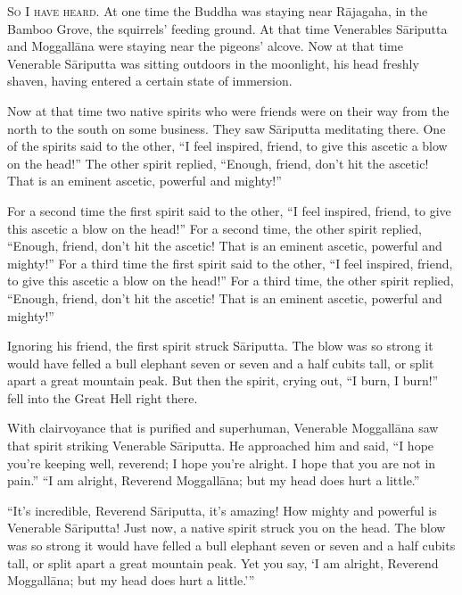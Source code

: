 \documentclass[12pt,openany]{book}%
\newcommand*{\scevam}[1]{\textsc{#1}}
\begin{document}
\scevam{So I have heard. }At one time the Buddha was staying near \textsanskrit{Rājagaha}, in the Bamboo Grove, the squirrels’ feeding ground. At that time Venerables \textsanskrit{Sāriputta} and \textsanskrit{Moggallāna} were staying near the pigeons’ alcove. Now at that time Venerable \textsanskrit{Sāriputta} was sitting outdoors in the moonlight, his head freshly shaven, having entered a certain state of immersion. 

Now at that time two native spirits who were friends were on their way from the north to the south on some business. They saw \textsanskrit{Sāriputta} meditating there. One of the spirits said to the other, “I feel inspired, friend, to give this ascetic a blow on the head!” The other spirit replied, “Enough, friend, don’t hit the ascetic! That is an eminent ascetic, powerful and mighty!” 

For a second time the first spirit said to the other, “I feel inspired, friend, to give this ascetic a blow on the head!” For a second time, the other spirit replied, “Enough, friend, don’t hit the ascetic! That is an eminent ascetic, powerful and mighty!” For a third time the first spirit said to the other, “I feel inspired, friend, to give this ascetic a blow on the head!” For a third time, the other spirit replied, “Enough, friend, don’t hit the ascetic! That is an eminent ascetic, powerful and mighty!” 

Ignoring his friend, the first spirit struck \textsanskrit{Sāriputta}. The blow was so strong it would have felled a bull elephant seven or seven and a half cubits tall, or split apart a great mountain peak. But then the spirit, crying out, “I burn, I burn!” fell into the Great Hell right there. 

With clairvoyance that is purified and superhuman, Venerable \textsanskrit{Moggallāna} saw that spirit striking Venerable \textsanskrit{Sāriputta}. He approached him and said, “I hope you’re keeping well, reverend; I hope you’re alright. I hope that you are not in pain.” “I am alright, Reverend \textsanskrit{Moggallāna}; but my head does hurt a little.” 

“It’s incredible, Reverend \textsanskrit{Sāriputta}, it’s amazing! How mighty and powerful is Venerable \textsanskrit{Sāriputta}! Just now, a native spirit struck you on the head. The blow was so strong it would have felled a bull elephant seven or seven and a half cubits tall, or split apart a great mountain peak. Yet you say, ‘I am alright, Reverend \textsanskrit{Moggallāna}; but my head does hurt a little.’” 
\end{document}

